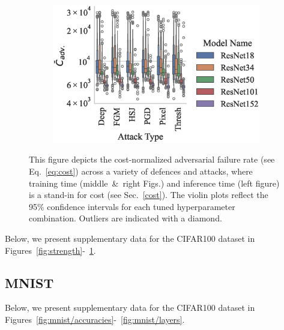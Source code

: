 \begin{figure}
\begin{subfigure}{0.28\textwidth}
        \centering
    \end{subfigure}
    \begin{subfigure}{0.42\textwidth}
        \includegraphics[width=\textwidth]{cifar100/adv_failures_per_train_time_vs_attack_type.eps}
        \centering
    \end{subfigure}
    \caption{This figure depicts the cost-normalized adversarial failure rate (see Eq.~\ref{eq:cost}) across a variety of defences and attacks, where training time (middle~\&~right Figs.) and inference time (left figure) is a stand-in for cost (see Sec.~\ref{cost}). The violin plots reflect the 95\% confidence intervals for each tuned hyperparameter combination. Outliers are indicated with a diamond.}
    \label{fig:failures_per_train_time}
\end{figure}

Below, we present supplementary data for the CIFAR100 dataset in Figures~\ref{fig:strength}-~\ref{fig:failures_per_train_time}.

\subsection{MNIST}
Below, we present supplementary data for the CIFAR100 dataset in Figures~\ref{fig:mnist/accuracies}-~\ref{fig:mnist/layers}.

